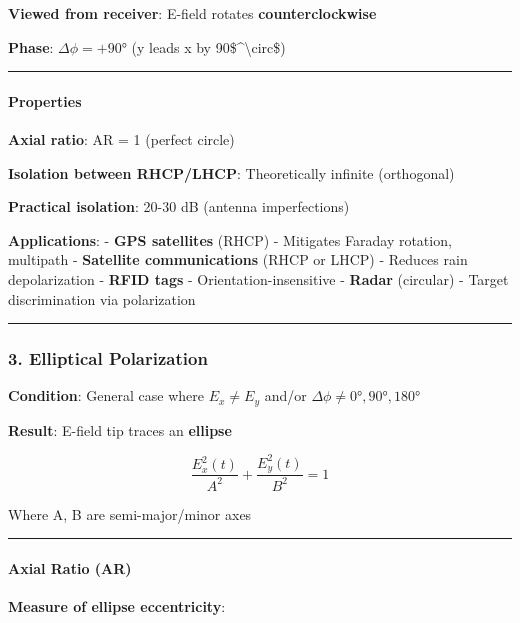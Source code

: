 \textbf{Viewed from receiver}: E-field rotates \textbf{counterclockwise}

\textbf{Phase}: \(\Delta\phi = +90°\) (y leads x by
90\$\^{}\textbackslash circ\$)

\begin{center}\rule{0.5\linewidth}{0.5pt}\end{center}

\paragraph{Properties}\label{properties}

\textbf{Axial ratio}: AR = 1 (perfect circle)

\textbf{Isolation between RHCP/LHCP}: Theoretically infinite
(orthogonal)

\textbf{Practical isolation}: 20-30 dB (antenna imperfections)

\textbf{Applications}: - \textbf{GPS satellites} (RHCP) - Mitigates
Faraday rotation, multipath - \textbf{Satellite communications} (RHCP or
LHCP) - Reduces rain depolarization - \textbf{RFID tags} -
Orientation-insensitive - \textbf{Radar} (circular) - Target
discrimination via polarization

\begin{center}\rule{0.5\linewidth}{0.5pt}\end{center}

\subsubsection{3. Elliptical
Polarization}\label{elliptical-polarization}

\textbf{Condition}: General case where \(E_x \neq E_y\) and/or
\(\Delta\phi \neq 0°, 90°, 180°\)

\textbf{Result}: E-field tip traces an \textbf{ellipse}

\[
\frac{E_x^2(t)}{A^2} + \frac{E_y^2(t)}{B^2} = 1
\]

Where A, B are semi-major/minor axes

\begin{center}\rule{0.5\linewidth}{0.5pt}\end{center}

\paragraph{Axial Ratio (AR)}\label{axial-ratio-ar}

\textbf{Measure of ellipse eccentricity}:

